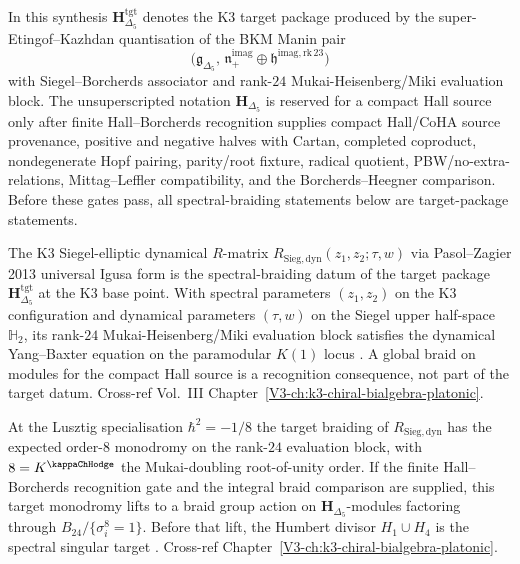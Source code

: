 \begin{remark}
In this synthesis $\mathbf H_{\Delta_5}^{\mathrm{tgt}}$ denotes the
K3 target package produced by the super-Etingof--Kazhdan quantisation
of the BKM Manin pair
\[
\bigl(\mathfrak g_{\Delta_5},\,
\mathfrak n_+^{\mathrm{imag}}\oplus
\mathfrak h^{\mathrm{imag,rk\,23}}\bigr)
\]
with Siegel--Borcherds associator and rank-$24$
Mukai-Heisenberg/Miki evaluation block. The unsuperscripted notation
$\mathbf H_{\Delta_5}$ is reserved for a compact Hall source only after
finite Hall--Borcherds recognition supplies compact Hall/CoHA source
provenance, positive and negative halves with Cartan, completed
coproduct, nondegenerate Hopf pairing, parity/root fixture, radical
quotient, PBW/no-extra-relations, Mittag--Leffler compatibility, and
the Borcherds--Heegner comparison. Before these gates pass, all
spectral-braiding statements below are target-package statements.
\end{remark}

\begin{remark}
\label{rem:specbraid-1}
The K3 Siegel-elliptic dynamical $R$-matrix
$R_{\mathrm{Sieg,dyn}}(z_1, z_2;\tau, w)$ via Pasol--Zagier 2013
universal Igusa form is the spectral-braiding datum of the target
package $\mathbf H_{\Delta_5}^{\mathrm{tgt}}$ at the K3 base point.
With spectral parameters $(z_1, z_2)$ on the K3 configuration and
dynamical parameters $(\tau, w)$ on the Siegel upper half-space
$\mathbb H_2$, its rank-$24$ Mukai-Heisenberg/Miki evaluation block
satisfies the dynamical Yang--Baxter equation on the paramodular
$K(1)$ locus \cite{PasolZagier2013,Felder1995}. A global braid on
modules for the compact Hall source is a recognition consequence, not
part of the target datum. Cross-ref Vol.~III
Chapter~\ref{V3-ch:k3-chiral-bialgebra-platonic}.
\end{remark}

\begin{remark}
\label{rem:specbraid-2}
At the Lusztig specialisation $\hbar^2 = -1/8$ the target braiding of
$R_{\mathrm{Sieg,dyn}}$ has the expected order-$8$ monodromy on the
rank-$24$ evaluation block, with $8 = K^{\kappaChHodge}$ the
Mukai-doubling root-of-unity order. If the finite Hall--Borcherds
recognition gate and the integral braid comparison are supplied, this
target monodromy lifts to a braid group action on
$\mathbf H_{\Delta_5}$-modules factoring through
$B_{24}/\{\sigma_i^8 = 1\}$. Before that lift, the Humbert divisor
$H_1\cup H_4$ is the spectral singular target
\cite{Lusztig1990,Bruinier2002}. Cross-ref
Chapter~\ref{V3-ch:k3-chiral-bialgebra-platonic}.
\end{remark}

